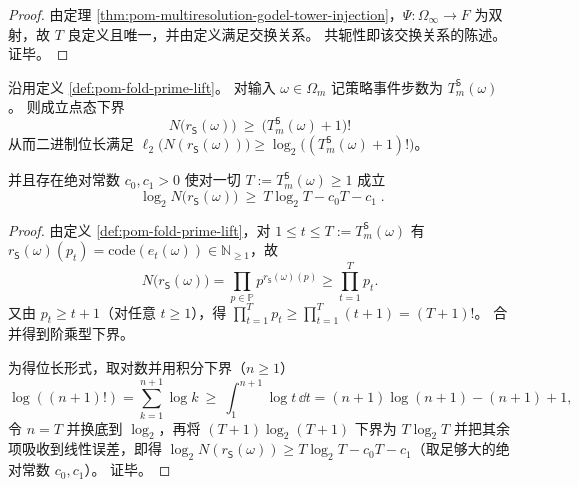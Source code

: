 \begin{proof}
由定理 \ref{thm:pom-multiresolution-godel-tower-injection}，\(\Psi:\Omega_\infty\to F\) 为双射，故 \(T\) 良定义且唯一，并由定义满足交换关系。
共轭性即该交换关系的陈述。证毕。
\end{proof}

\begin{corollary}\label{cor:pom-prime-register-godel-factorial-pointwise}
沿用定义 \ref{def:pom-fold-prime-lift}。
对输入 \(\omega\in\Omega_m\) 记策略事件步数为 \(T_m^{\mathsf S}(\omega)\)。
则成立点态下界
\[
\boxed{\;
N\!\bigl(r_{\mathsf S}(\omega)\bigr)\ \ge\ \bigl(T_m^{\mathsf S}(\omega)+1\bigr)!\;}
\]
从而二进制位长满足
\(
\ell_2\!\bigl(N(r_{\mathsf S}(\omega))\bigr)\ge \log_2\!\bigl((T_m^{\mathsf S}(\omega)+1)!\bigr)
\)。
\par
并且存在绝对常数 \(c_0,c_1>0\) 使对一切 \(T:=T_m^{\mathsf S}(\omega)\ge 1\) 成立
\[
\boxed{\;
\log_2 N\!\bigl(r_{\mathsf S}(\omega)\bigr)
\ \ge\
T\log_2 T-c_0T-c_1\; }.
\]
\end{corollary}
\begin{proof}
由定义 \ref{def:pom-fold-prime-lift}，对 \(1\le t\le T:=T_m^{\mathsf S}(\omega)\) 有 \(r_{\mathsf S}(\omega)(p_t)=\mathrm{code}(e_t(\omega))\in\mathbb{N}_{\ge 1}\)，故
\[
N\!\bigl(r_{\mathsf S}(\omega)\bigr)
=\prod_{p\in\mathbb{P}}p^{r_{\mathsf S}(\omega)(p)}
\ge \prod_{t=1}^{T}p_t.
\]
又由 \(p_t\ge t+1\)（对任意 \(t\ge 1\)），得
\(
\prod_{t=1}^{T}p_t\ge \prod_{t=1}^{T}(t+1)=(T+1)!
\)。
合并得到阶乘型下界。
\par
为得位长形式，取对数并用积分下界（\(n\ge 1\)）
\[
\log((n+1)!)=\sum_{k=1}^{n+1}\log k\ \ge\ \int_{1}^{n+1}\log t\,\dd t
=(n+1)\log(n+1)-(n+1)+1,
\]
令 \(n=T\) 并换底到 \(\log_2\)，再将 \((T+1)\log_2(T+1)\) 下界为 \(T\log_2 T\) 并把其余项吸收到线性误差，即得
\(\log_2 N(r_{\mathsf S}(\omega))\ge T\log_2 T-c_0T-c_1\)（取足够大的绝对常数 \(c_0,c_1\)）。
证毕。
\end{proof}

\endinput
